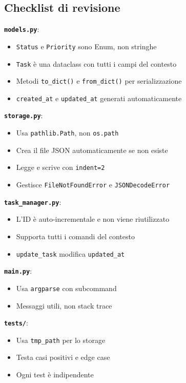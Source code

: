 \subsection*{Checklist di revisione}

\textbf{\texttt{models.py}}:
\begin{itemize}
  \item \texttt{Status} e \texttt{Priority} sono Enum, non stringhe
  \item \texttt{Task} è una dataclass con tutti i campi del contesto
  \item Metodi \texttt{to\_dict()} e \texttt{from\_dict()} per serializzazione
  \item \texttt{created\_at} e \texttt{updated\_at} generati automaticamente
\end{itemize}

\textbf{\texttt{storage.py}}:
\begin{itemize}
  \item Usa \texttt{pathlib.Path}, non \texttt{os.path}
  \item Crea il file JSON automaticamente se non esiste
  \item Legge e scrive con \texttt{indent=2}
  \item Gestisce \texttt{FileNotFoundError} e \texttt{JSONDecodeError}
\end{itemize}

\textbf{\texttt{task\_manager.py}}:
\begin{itemize}
  \item L'ID è auto-incrementale e non viene riutilizzato
  \item Supporta tutti i comandi del contesto
  \item \texttt{update\_task} modifica \texttt{updated\_at}
\end{itemize}

\textbf{\texttt{main.py}}:
\begin{itemize}
  \item Usa \texttt{argparse} con subcommand
  \item Messaggi utili, non stack trace
\end{itemize}

\textbf{\texttt{tests/}}:
\begin{itemize}
  \item Usa \texttt{tmp\_path} per lo storage
  \item Testa casi positivi e edge case
  \item Ogni test è indipendente
\end{itemize}

